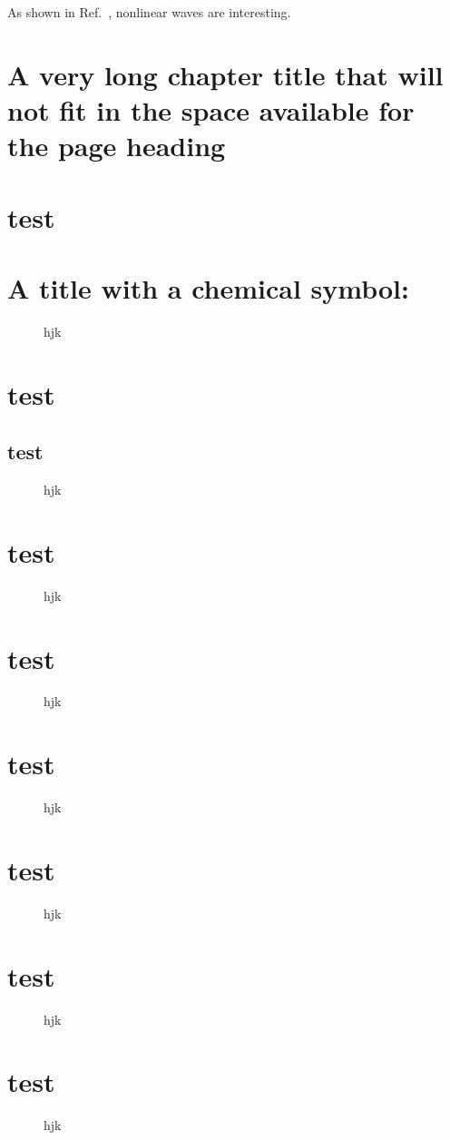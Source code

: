 \documentclass[natbib]{muthesis09}
\newcommand{\bfig}{\begin{figure}}
\newcommand{\efig}{\end{figure}}
\begin{document}
As shown in Ref.~\cite{APR06,MP99,ZK74}, nonlinear waves are interesting.


\chapter[Very long chapter title]
{A very long chapter title that will not fit in the
  space available for the page heading}
\chapter{test}
\chapter{A title with a chemical symbol: }
\bfig
\vspace{2cm}
\caption{hjk}
\efig
\chapter{test}
\section{test}
\bfig
\vspace{2cm}
\caption{hjk}
\efig
\chapter{test}
\bfig
\vspace{2cm}
\caption{hjk}
\efig
\chapter{test}
\bfig
\vspace{2cm}
\caption{hjk}
\efig
\chapter{test}
\bfig
\vspace{2cm}
\caption{hjk}
\efig
\chapter{test}
\bfig
\vspace{2cm}
\caption{hjk}
\efig
\chapter{test}
\bfig
\vspace{2cm}
\caption{hjk}
\efig
\chapter{test}
\bfig
\vspace{2cm}
\caption{hjk}
\efig
\end{document}
